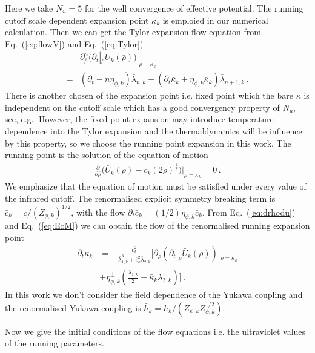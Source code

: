 \documentclass[%
reprint,
superscriptaddress,
showpacs,preprintnumbers,
 amsmath,amssymb,
 aps,
prd,
]{revtex4-1}
\def\Eq#1{Eq.~(\ref{#1})}
\begin{document}
Here we take $N_u=5$ for the well convergence of effective potential. The running cutoff scale dependent expansion point $\kappa_k$ is emploied in our numerical calculation. Then we can get the Tylor expansion flow equation from \Eq{eq:flowV} and \Eq{eq:Tylor} 
\begin{align}
&\partial^n_{\bar{\rho}}\bigg(\partial_t |_\rho\bar{U}_k(\bar{\rho})\bigg)|_{\bar{\rho}=\bar{\kappa}_k}\nonumber\\[2ex]
=&(\partial_t-n\eta_{\phi,k})\bar{\lambda}_{n,k}-(\partial_t\bar{\kappa}_k+\eta_{\phi,k}\bar{\kappa}_k)\bar{\lambda}_{n+1,k}\,.\label{eq:drhodu}
\end{align}
There is another chosen of the expansion point i.e. fixed point which the bare $\kappa$ is independent on the cutoff scale which has a good convergency property of $N_u$, see, e.g.\cite{Pawlowski:2014zaa,Yin:2019ebz}. However, the fixed point expansion may introduce temperature dependence into the Tylor expansion and the thermaldynamics will be influence by this property, so we choose the running point expansion in this work. The running point is the solution of the equation of motion
\begin{align}
\frac{\partial}{\partial \bar{\rho}}\bigg( \bar{U}_k(\bar{\rho})-\bar{c}_k(2\bar{\rho})^{\frac{1}{2}}\bigg)\big|_{\bar{\rho}=\bar{\kappa}_k}=0\,.\label{eq:EoM}
\end{align}
We emphasize that the equation of motion must be satisfied under every value of the infrared cutoff. The renormalised explicit symmetry breaking term is $\bar{c}_k=c/(Z_{\phi,k})^{1/2}$, with the flow $\partial_t \bar{c}_k=(1/2)\eta_{\phi,k}\bar{c}_k$. From \Eq{eq:drhodu} and \Eq{eq:EoM} we can obtain the flow of the renormalised running expansion point
\begin{align}
  \partial_t \bar \kappa_k&=-\frac{\bar c_k^2}{\bar{\lambda}_{1,k}^3+\bar c_k^2\bar{\lambda}_{2,k}}\bigg[\partial_{\bar \rho}\left(\partial_t\big|_{\rho} \bar U_k(\bar \rho)\right)\Big|_{\bar \rho=\bar \kappa_k}\nonumber \\[2ex]
  &+\eta_{\phi,k}^{\perp}\left(\frac{\bar{\lambda}_{1,k}}{2}+\bar\kappa_k\bar{\lambda}_{2,k}\right)\bigg]\,.\label{}
\end{align}
In this work we don't consider the field dependence of the Yukawa coupling and the renormalised Yukawa coupling is $\bar{h}_k=h_k/(Z_{\psi,k}Z^{1/2}_{\phi,k})$.\par
Now we give the initial conditions of the flow equations i.e. the ultraviolet values of the running parameters.
\end{document}
